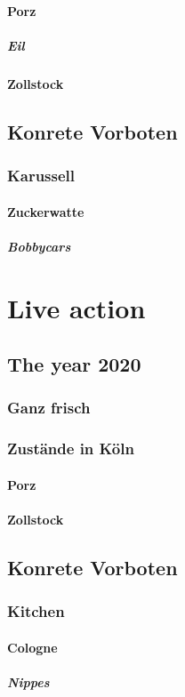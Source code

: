 \documentclass[]{scrbook}
\begin{document}
\subsection{Porz}
\subsubsection{Eil}
\Blindtext
\subsection{Zollstock}
\Blindtext
\chapter{Konrete Vorboten}
\section{Karussell}
\Blindtext
\subsection{Zuckerwatte}
\subsubsection{Bobbycars}
\Blindtext
\part{Live action}
\chapter{The year 2020}
\section{Ganz frisch}
\Blindtext
\section{Zustände in Köln}
\subsection{Porz}
\Blindtext
\subsection{Zollstock}
\Blindtext
\chapter{Konrete Vorboten}
\section{Kitchen}
\Blindtext
\subsection{Cologne}
\subsubsection{Nippes}
\Blindtext
\end{document}
